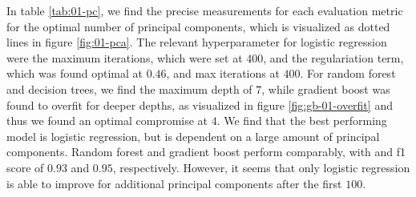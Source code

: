 In table \ref{tab:01-pc}, we find the precise measurements for each evaluation metric for the optimal number of principal components, which is visualized as dotted lines in figure \ref{fig:01-pca}. The relevant hyperparameter for logistic regression were the maximum iterations, which were set at $400$, and the regulariation term, which was found optimal at $0.46$, and max iterations at $400$. For random forest and decision trees, we find the maximum depth of $7$, while gradient boost was found to overfit for deeper depths, as visualized in figure \ref{fig:gb-01-overfit} and thus we found an optimal compromise at $4$. We find that the best performing model is logistic regression, but is dependent on a large amount of principal components. Random forest and gradient boost perform comparably, with and f1 score of $0.93$ and $0.95$, respectively. However, it seems that only logistic regression is able to improve for additional principal components after the first $100$.

